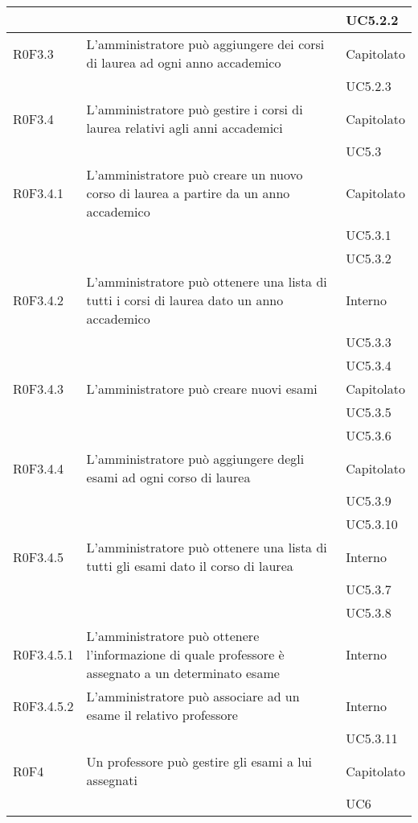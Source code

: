 \documentclass[AnalisiDeiRequisiti.tex]{subfiles}
\begin{document}
\begin{longtable}[H]{|p{2cm}|p{5cm}|p{5cm}|}
	& & UC5.2.2 \\ \hline
	R0F3.3 &  L'amministratore può aggiungere dei corsi di laurea ad ogni anno accademico & Capitolato \\ 
	& & UC5.2.3 \\ \hline
	R0F3.4 &  L'amministratore può gestire i corsi di laurea relativi agli anni accademici & Capitolato \\ 
	& & UC5.3 \\  \hline
	R0F3.4.1 &  L'amministratore può creare un nuovo corso di laurea a partire da un anno accademico & Capitolato \\ 
	& & UC5.3.1 \\  
	& & UC5.3.2 \\ \hline
	R0F3.4.2 &  L'amministratore può ottenere una lista di tutti i corsi di laurea dato un anno accademico & Interno \\ 
	& & UC5.3.3 \\  
	& & UC5.3.4 \\ \hline
	R0F3.4.3 &  L'amministratore può creare nuovi esami & Capitolato \\ 
	& & UC5.3.5 \\  
	& & UC5.3.6 \\ \hline
	R0F3.4.4 &  L'amministratore può aggiungere degli esami ad ogni corso di laurea & Capitolato \\ 
	& & UC5.3.9 \\ \hline
	& & UC5.3.10 \\ \hline
	R0F3.4.5 &  L'amministratore può ottenere una lista di tutti gli esami dato il corso di laurea & Interno \\ 
	& & UC5.3.7 \\ 
	& & UC5.3.8 \\ \hline
	R0F3.4.5.1 &  L'amministratore può ottenere l'informazione di quale professore è assegnato a un determinato esame & Interno \\ \hline
	R0F3.4.5.2  &  L'amministratore può associare ad un esame il relativo professore & Interno \\ 
	& & UC5.3.11 \\ \hline
	R0F4 &  Un professore può gestire gli esami a lui assegnati & Capitolato \\ 
	& & UC6 \\ \hline

\end{longtable}
\end{document}
